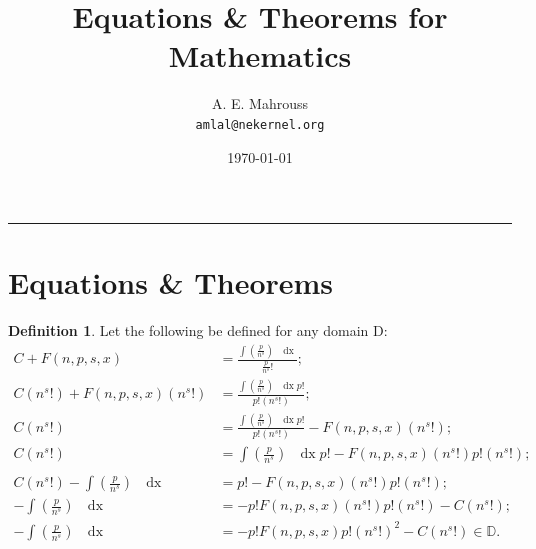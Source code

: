 \documentclass[10pt]{article}
\title{%
  \vspace{-1.5em}%
  \large\textbf{Equations \& Theorems for Mathematics}%
}
\author{A. E. Mahrouss\\\texttt{amlal@nekernel.org}}
\date{\today}
\theoremstyle{plain}
\theoremstyle{definition}
\newtheorem{definition}[theorem]{Definition}
\theoremstyle{remark}
\begin{document}
  \maketitle
\vspace{-0.5em}
\vspace{0.8em}
\rule{\linewidth}{0.4pt}
\vspace{1em}

\section{Equations \& Theorems}

\begin{definition}
	Let the following be defined for any domain D:
\begin{align*}
	C + F(n, p, s, x) &= \frac{\int (\frac{p}{n^{s}}) \text{ } \operatorname{dx}}{\frac{p}{n^{s}}! };\\
	C (n^{s}!) + F(n, p, s, x)(n^{s}!) &= \frac{ {\int (\frac{p}{n^{s}}) \text{ } \operatorname{dx}}{p!}}{p! (n^{s}!)};\\
	C (n^{s}!) &= \frac{ {\int (\frac{p}{n^{s}}) \text{ } \operatorname{dx}}{p!}}{p! (n^{s}!)} - F(n, p, s, x)(n^{s}!);\\
		C (n^{s}!) &= \int (\frac{p}{n^{s}}) \text{ } \operatorname{dx}{p!} - F(n, p, s, x)(n^{s}!) p! (n^{s}!);\\\\
	C (n^{s}!) -\int (\frac{p}{n^{s}}) \text{ } \operatorname{dx} &= p! - F(n, p, s, x)(n^{s}!) p! (n^{s}!);\\
	-\int (\frac{p}{n^{s}}) \text{ } \operatorname{dx} &= - p! F(n, p, s, x)(n^{s}!) p! (n^{s}!) - C (n^{s}!);\\
	-\int (\frac{p}{n^{s}})\text{ } \operatorname{dx} &=  - p! F(n, p, s, x)p!(n^{s}!)^{2} - C (n^{s}!) \in \mathbb{D}.
\end{align*}
\end{definition}

\nocite{*}



\end{document}
